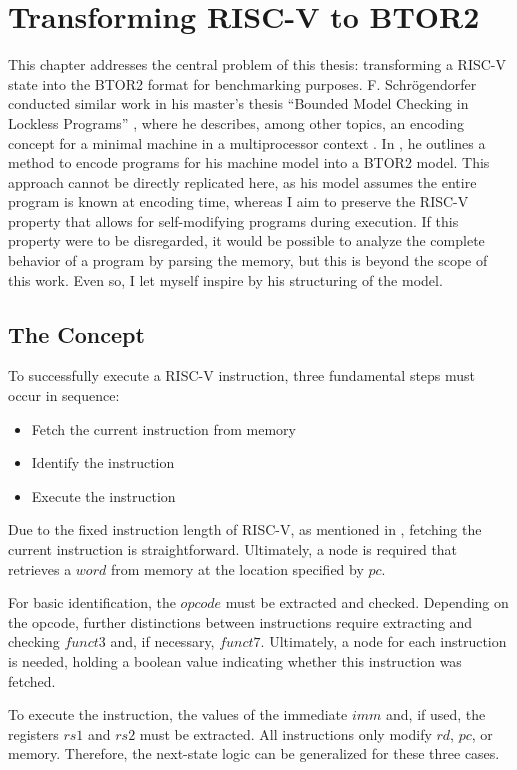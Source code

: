 \chapter{Transforming RISC-V to BTOR2}\label{chap:riscv_to_btor2}

This chapter addresses the central problem of this thesis:
transforming a RISC-V state into the BTOR2 format for benchmarking
purposes. F. Schrögendorfer conducted similar work in his master's
thesis \enquote{Bounded Model Checking in Lockless Programs}
\cite{bmcOfLockless}, where he describes, among other topics, an
encoding concept for a minimal machine in a multiprocessor context
\cite[Chapter 2]{bmcOfLockless}. In \cite[Chapter 8]{bmcOfLockless},
he outlines a method to encode programs for his machine model into a
BTOR2 model. This approach cannot be directly replicated here, as his
model assumes the entire program is known at encoding time, whereas I
aim to preserve the RISC-V property that allows for self-modifying
programs during execution. If this property were to be disregarded,
it would be possible to analyze the complete behavior of a program by
parsing the memory, but this is beyond the scope of this work. Even
so, I let myself inspire by his structuring of the model.

\section{The Concept}
To successfully execute a RISC-V instruction, three fundamental steps
must occur in sequence:
\begin{itemize}
    \item Fetch the current instruction from memory
    \item Identify the instruction
    \item Execute the instruction
\end{itemize}
Due to the fixed instruction length of RISC-V, as mentioned in , fetching the current instruction is straightforward. Ultimately, a node is required that retrieves a $word$ from memory at the location specified by $pc$.

For basic identification, the $opcode$ must be extracted and checked.
Depending on the opcode, further distinctions between instructions
require extracting and checking $funct3$ and, if necessary, $funct7$.
Ultimately, a node for each instruction is needed, holding a boolean
value indicating whether this instruction was fetched.

To execute the instruction, the values of the immediate $imm$ and, if
used, the registers $rs1$ and $rs2$ must be extracted. All
instructions only modify $rd$, $pc$, or memory. Therefore, the
next-state logic can be generalized for these three cases.

